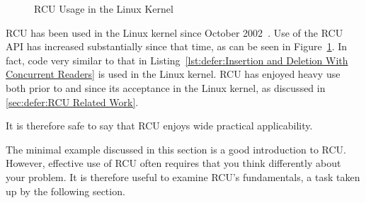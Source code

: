 \begin{figure}[tb]
\centering
{}
\caption{RCU Usage in the Linux Kernel}
\label{fig:defer:RCU Usage in the Linux Kernel}
\end{figure}

RCU has been used in the Linux kernel since
October 2002~\cite{Torvalds2.5.43}.
Use of the RCU API has increased substantially since that time,
as can be seen in
Figure~\ref{fig:defer:RCU Usage in the Linux Kernel}.
In fact, code very similar to that in
Listing~\ref{lst:defer:Insertion and Deletion With Concurrent Readers}
is used in the Linux kernel.
RCU has enjoyed heavy use both prior to and since its acceptance
in the Linux kernel, as discussed in
\cref{sec:defer:RCU Related Work}.

It is therefore safe to say that RCU enjoys wide practical applicability.

The minimal example discussed in this section is a good introduction to RCU\@.
However, effective use of RCU often requires that you think differently
about your problem.
It is therefore useful to examine RCU's fundamentals, a task taken up
by the following section.
